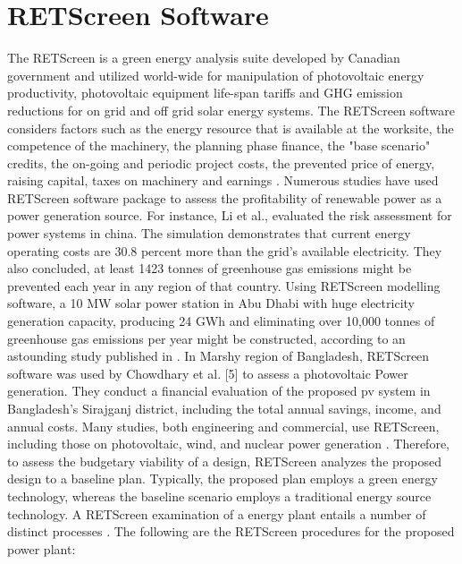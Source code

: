 \documentclass[conference]{IEEEtran}
\begin{document}
\section{RETScreen Software}
The RETScreen is a green energy analysis suite developed by Canadian government and utilized world-wide for manipulation of photovoltaic energy productivity, photovoltaic equipment life-span tariffs and GHG emission reductions for on grid and off grid solar energy systems.\newline
The RETScreen software considers factors such as the energy resource that is available at the worksite, the competence of the machinery, the planning phase finance, the "base scenario" credits, the on-going and periodic project costs, the prevented price of energy, raising capital, taxes on machinery and earnings \cite{samuel2021techno}. Numerous studies have used RETScreen software package to assess the profitability of renewable power as a power generation source. For instance, Li et al.\cite{li2021evaluation}, evaluated the risk assessment for power systems in china. The simulation demonstrates that current energy operating costs are 30.8 percent more than the grid's available electricity. They also concluded, at least 1423 tonnes of greenhouse gas emissions might be prevented each year in any region of that country. Using RETScreen modelling software, a 10 MW solar power station in Abu Dhabi with huge electricity generation capacity, producing 24 GWh and eliminating over 10,000 tonnes of greenhouse gas emissions per year might be constructed, according to an astounding study published in \cite{sreenath20217e}. In Marshy region of Bangladesh, RETScreen software was used by Chowdhary et al. [5] to assess a photovoltaic Power generation.
They conduct a financial evaluation of the proposed pv system in Bangladesh's Sirajganj district, including the total annual savings, income, and annual costs. Many studies, both engineering and commercial, use RETScreen, including those on photovoltaic, wind, and nuclear power generation \cite{riaz2021techno}.\newline
Therefore, to assess the budgetary viability of a design, RETScreen analyzes the proposed design to a baseline plan.
Typically, the proposed plan employs a green energy technology, whereas the baseline scenario employs a traditional energy source technology. A RETScreen examination of a energy plant entails a number of distinct processes \cite{kalkal2022sustainable,n2022effect}. The following are the RETScreen procedures for the proposed power plant:
\end{document}
